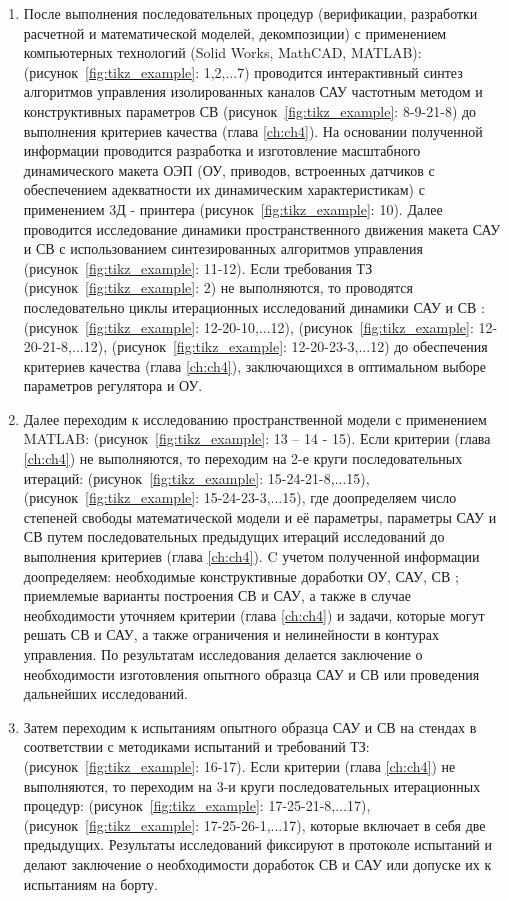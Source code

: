 \begin{enumerate}
	\item После выполнения последовательных процедур (верификации, разработки расчетной и математической моделей, декомпозиции) с применением компьютерных технологий (Solid Works, MathCAD, MATLAB): (рисунок~\ref{fig:tikz_example}: 1,2,...7) проводится интерактивный синтез алгоритмов управления изолированных каналов САУ частотным методом \cite[]{Bessekerski20} и конструктивных параметров СВ (рисунок~\ref{fig:tikz_example}: 8-9-21-8) до выполнения критериев качества (глава \ref{ch:ch4}). На основании полученной информации проводится разработка и изготовление масштабного динамического макета ОЭП (ОУ, приводов, встроенных датчиков с обеспечением адекватности их динамическим характеристикам) с применением 3Д - принтера (рисунок~\ref{fig:tikz_example}: 10). Далее проводится исследование динамики пространственного движения макета САУ и СВ с использованием синтезированных алгоритмов управления (рисунок~\ref{fig:tikz_example}: 11-12). Если требования ТЗ (рисунок~\ref{fig:tikz_example}: 2) не выполняются, то проводятся последовательно циклы итерационных исследований динамики САУ и СВ : (рисунок~\ref{fig:tikz_example}: 12-20-10,...12), (рисунок~\ref{fig:tikz_example}: 12-20-21-8,...12), (рисунок~\ref{fig:tikz_example}: 12-20-23-3,...12) до обеспечения критериев качества (глава \ref{ch:ch4}), заключающихся в оптимальном выборе параметров регулятора и ОУ.
	\item Далее переходим к исследованию пространственной модели с применением MATLAB: 
	(рисунок~\ref{fig:tikz_example}: 13 – 14 - 15). Если критерии (глава \ref{ch:ch4}) не выполняются, то переходим на 2-е круги последовательных итераций: (рисунок~\ref{fig:tikz_example}: 15-24-21-8,...15), (рисунок~\ref{fig:tikz_example}: 15-24-23-3,...15), где доопределяем число степеней свободы математической модели и её параметры, параметры САУ и СВ путем последовательных предыдущих итераций исследований до выполнения критериев (глава \ref{ch:ch4}). C учетом полученной информации доопределяем: необходимые конструктивные доработки  ОУ, САУ, СВ ; приемлемые варианты построения СВ и САУ, а также в случае необходимости уточняем критерии (глава \ref{ch:ch4}) и задачи, которые могут решать СВ и САУ, а также ограничения и нелинейности в контурах управления. По результатам исследования делается заключение о необходимости изготовления опытного образца САУ и СВ или проведения дальнейших исследований.
	
	\item Затем переходим к испытаниям опытного образца САУ и СВ на стендах в соответствии с методиками испытаний и требований ТЗ: (рисунок~\ref{fig:tikz_example}: 16-17). Если критерии (глава \ref{ch:ch4}) не выполняются, то переходим  на 
	3-и круги последовательных итерационных процедур: (рисунок~\ref{fig:tikz_example}: 17-25-21-8,...17), (рисунок~\ref{fig:tikz_example}: 17-25-26-1,...17), которые включает в себя две предыдущих. Результаты исследований фиксируют в протоколе испытаний и делают заключение о необходимости доработок СВ и САУ или допуске их к испытаниям на борту. 
	

\end{enumerate}

